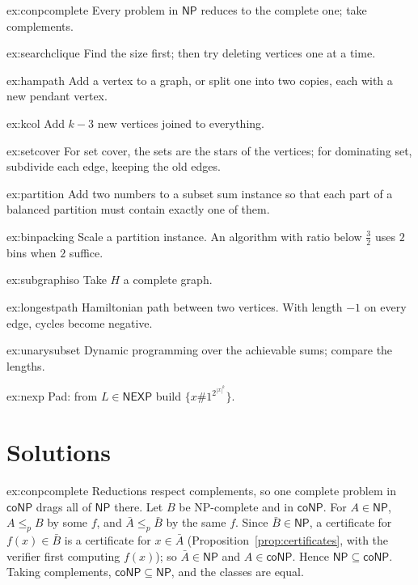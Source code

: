 \begin{hint}{ex:conpcomplete}
Every problem in $\mathsf{NP}$ reduces to the complete one; take complements.
\end{hint}
\begin{hint}{ex:searchclique}
Find the size first; then try deleting vertices one at a time.
\end{hint}
\begin{hint}{ex:hampath}
Add a vertex to a graph, or split one into two copies, each with a new pendant vertex.
\end{hint}
\begin{hint}{ex:kcol}
Add $k-3$ new vertices joined to everything.
\end{hint}
\begin{hint}{ex:setcover}
For set cover, the sets are the stars of the vertices; for dominating set, subdivide each edge, keeping the old edges.
\end{hint}
\begin{hint}{ex:partition}
Add two numbers to a subset sum instance so that each part of a balanced partition must contain exactly one of them.
\end{hint}
\begin{hint}{ex:binpacking}
Scale a partition instance. An algorithm with ratio below $\frac32$ uses $2$ bins when $2$ suffice.
\end{hint}
\begin{hint}{ex:subgraphiso}
Take $H$ a complete graph.
\end{hint}
\begin{hint}{ex:longestpath}
Hamiltonian path between two vertices. With length $-1$ on every edge, cycles become negative.
\end{hint}
\begin{hint}{ex:unarysubset}
Dynamic programming over the achievable sums; compare the lengths.
\end{hint}
\begin{hint}{ex:nexp}
Pad: from $L\in\mathsf{NEXP}$ build $\{x\#1^{2^{|x|^k}}\}$.
\end{hint}

\section{Solutions}

\begin{solution}{ex:conpcomplete}
\idea Reductions respect complements, so one complete problem in $\mathsf{coNP}$ drags all of $\mathsf{NP}$ there.
\writeup Let $B$ be NP-complete and in $\mathsf{coNP}$. For $A\in\mathsf{NP}$, $A\le_pB$ by some $f$, and $\bar A\le_p\bar B$ by the same $f$. Since $\bar B\in\mathsf{NP}$, a certificate for $f(x)\in\bar B$ is a certificate for $x\in\bar A$ (Proposition~\ref{prop:certificates}, with the verifier first computing $f(x)$); so $\bar A\in\mathsf{NP}$ and $A\in\mathsf{coNP}$. Hence $\mathsf{NP}\subseteq\mathsf{coNP}$. Taking complements, $\mathsf{coNP}\subseteq\mathsf{NP}$, and the classes are equal.
\end{solution}

